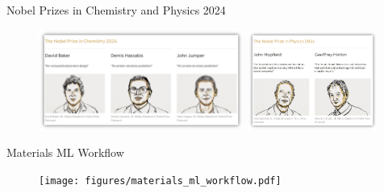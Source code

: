 \documentclass[aspectratio=169]{beamer}
\begin{document}
    \begin{frame}{Nobel Prizes in Chemistry and Physics 2024}
        \begin{figure}
            \centering
            \includegraphics[width=0.6\textwidth]{lectures/slides_tex/figures/nobel-chem-2024.png}
            \includegraphics[width=0.38\textwidth]{lectures/slides_tex/figures/nobel-physics-2024.png}
        \end{figure}
    \end{frame}


    \begin{frame}[t]{Materials ML Workflow}
        \begin{figure}
            \centering
            \texttt{[image: figures/materials\_ml\_workflow.pdf]}
        \end{figure}
    \end{frame}
\end{document}
